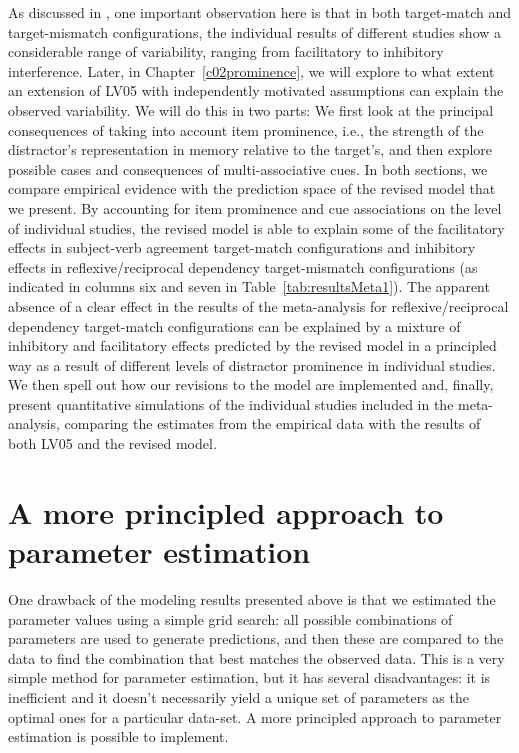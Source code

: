 \documentclass{cambridge7A}\usepackage[]{graphicx}\usepackage[]{color}
\begin{document}
As discussed in \cite{JaegerEngelmannVasishth2017}, one important observation here is that in both  
target-match and target-mismatch configurations, the individual results of different studies show a considerable range of variability, ranging from facilitatory to inhibitory interference.
Later, in Chapter~\ref{c02prominence}, we will explore to what extent an extension of LV05 with independently motivated assumptions can explain the observed variability.
We will do this in two parts: We first look at the principal consequences of taking into account  item prominence, i.e., the strength of the distractor's representation in memory relative to the target's, and then explore possible cases and consequences of  multi-associative cues. In both sections, we compare empirical evidence with the prediction space of the revised model that we present. By accounting for item prominence and cue associations on the level of individual studies, the revised model is able to explain some of the facilitatory effects in subject-verb agreement target-match configurations and inhibitory effects in reflexive/reciprocal dependency target-mismatch configurations (as indicated in columns six and seven in Table~\ref{tab:resultsMeta1}). The apparent absence of a clear effect in the results of the meta-analysis for reflexive/reciprocal dependency target-match configurations can be explained by a mixture of inhibitory and facilitatory effects predicted by the revised model in a principled way as a result of different levels of distractor prominence in individual studies.
We then spell out how our revisions to the model are implemented and, finally, present quantitative simulations of the individual studies included in the \cite{JaegerEngelmannVasishth2017} meta-analysis, comparing the estimates from the empirical data with the results of both LV05 and the revised model.

\newpage

\section{A more principled approach to parameter estimation}

One drawback of the modeling results presented above is that we estimated the parameter values using a simple grid search: all possible combinations of parameters are used to generate predictions, and then these are compared to the data to find the combination that best matches the observed data. This is a very simple method for parameter estimation, but it has several disadvantages: it is inefficient and it doesn't necessarily yield a unique set of parameters as the optimal ones for a particular data-set. A more principled approach to parameter estimation is possible to implement.
\end{document}
